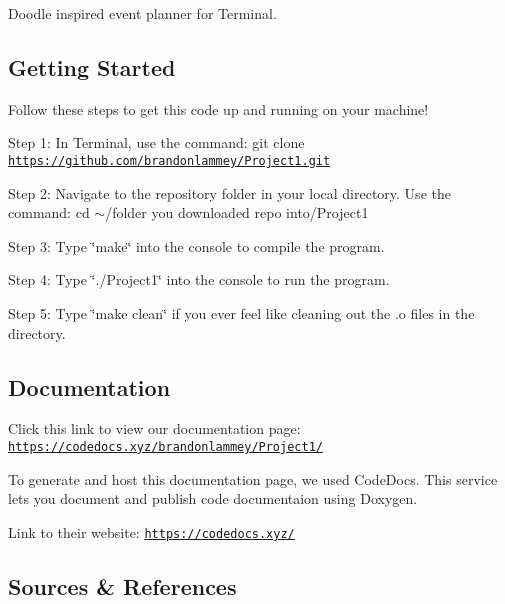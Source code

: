Doodle inspired event planner for Terminal.

\subsection*{Getting Started}

Follow these steps to get this code up and running on your machine!

Step 1\+: In Terminal, use the command\+: git clone \href{https://github.com/brandonlammey/Project1.git}{\tt https\+://github.\+com/brandonlammey/\+Project1.\+git}

Step 2\+: Navigate to the repository folder in your local directory. Use the command\+: cd $\sim$/folder you downloaded repo into/\+Project1

Step 3\+: Type \char`\"{}make\char`\"{} into the console to compile the program.

Step 4\+: Type \char`\"{}./\+Project1\char`\"{} into the console to run the program.

Step 5\+: Type \char`\"{}make clean\char`\"{} if you ever feel like cleaning out the .o files in the directory.

\subsection*{Documentation}

Click this link to view our documentation page\+: \href{https://codedocs.xyz/brandonlammey/Project1/}{\tt https\+://codedocs.\+xyz/brandonlammey/\+Project1/}

To generate and host this documentation page, we used Code\+Docs. This service lets you document and publish code documentaion using Doxygen.

Link to their website\+: \href{https://codedocs.xyz/}{\tt https\+://codedocs.\+xyz/}

\subsection*{Sources \& References}

